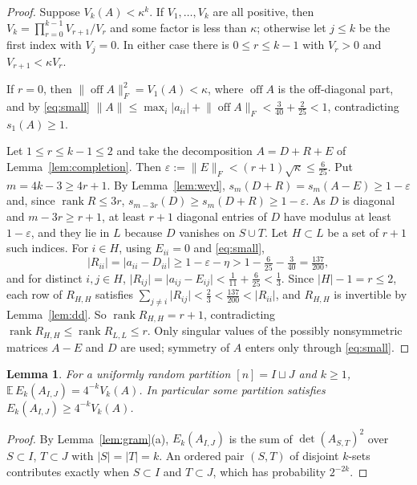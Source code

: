 \documentclass[11pt]{amsart}
\numberwithin{equation}{section}
\newtheorem{lemma}[theorem]{Lemma}
\theoremstyle{definition}
\theoremstyle{remark}
\newcommand{\E}{\mathbb E}
\newcommand{\1}{\mathbf 1}
\DeclareMathOperator{\rank}{rank}
\DeclareMathOperator{\off}{off}
\newcommand{\norm}[1]{\lVert #1\rVert}
\newcommand{\abs}[1]{\lvert #1\rvert}
\begin{document}
\begin{proof}
Suppose $V_k(A)<\kappa^k$. If $V_1,\dots,V_k$ are all positive, then $V_k=\prod_{r=0}^{k-1}V_{r+1}/V_r$ and some factor is less than $\kappa$; otherwise let $j\le k$ be the first index with $V_j=0$. In either case there is $0\le r\le k-1$ with $V_r>0$ and $V_{r+1}<\kappa V_r$.

If $r=0$, then $\norm{\off A}_F^2=V_1(A)<\kappa$, where $\off A$ is the off-diagonal part, and by \eqref{eq:small} $\norm A\le\max_i\abs{a_{ii}}+\norm{\off A}_F<\frac3{40}+\frac2{25}<1$, contradicting $s_1(A)\ge1$.

Let $1\le r\le k-1\le2$ and take the decomposition $A=D+R+E$ of Lemma~\ref{lem:completion}. Then $\varepsilon:=\norm E_F<(r+1)\sqrt\kappa\le\frac6{25}$. Put $m=4k-3\ge4r+1$. By Lemma~\ref{lem:weyl}, $s_m(D+R)=s_m(A-E)\ge1-\varepsilon$ and, since $\rank R\le3r$, $s_{m-3r}(D)\ge s_m(D+R)\ge1-\varepsilon$. As $D$ is diagonal and $m-3r\ge r+1$, at least $r+1$ diagonal entries of $D$ have modulus at least $1-\varepsilon$, and they lie in $L$ because $D$ vanishes on $S\cup T$. Let $H\subset L$ be a set of $r+1$ such indices. For $i\in H$, using $E_{ii}=0$ and \eqref{eq:small},
\[
\abs{R_{ii}}=\abs{a_{ii}-D_{ii}}\ge1-\varepsilon-\eta>1-\tfrac6{25}-\tfrac3{40}=\tfrac{137}{200},
\]
and for distinct $i,j\in H$, $\abs{R_{ij}}=\abs{a_{ij}-E_{ij}}<\frac1{11}+\frac6{25}<\frac13$. Since $\abs H-1=r\le2$, each row of $R_{H,H}$ satisfies $\sum_{j\ne i}\abs{R_{ij}}<\frac23<\frac{137}{200}<\abs{R_{ii}}$, and $R_{H,H}$ is invertible by Lemma~\ref{lem:dd}. So $\rank R_{H,H}=r+1$, contradicting $\rank R_{H,H}\le\rank R_{L,L}\le r$. Only singular values of the possibly nonsymmetric matrices $A-E$ and $D$ are used; symmetry of $A$ enters only through \eqref{eq:small}.
\end{proof}

\begin{lemma}\label{lem:cut}
For a uniformly random partition $[n]=I\sqcup J$ and $k\ge1$, $\E\,E_k(A_{I,J})=4^{-k}V_k(A)$. In particular some partition satisfies $E_k(A_{I,J})\ge4^{-k}V_k(A)$.
\end{lemma}

\begin{proof}
By Lemma~\ref{lem:gram}(a), $E_k(A_{I,J})$ is the sum of $\det(A_{S,T})^2$ over $S\subset I$, $T\subset J$ with $\abs S=\abs T=k$. An ordered pair $(S,T)$ of disjoint $k$-sets contributes exactly when $S\subset I$ and $T\subset J$, which has probability $2^{-2k}$.
\end{proof}
\end{document}

